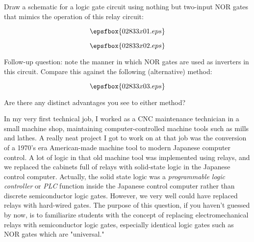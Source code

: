 

Draw a schematic for a logic gate circuit using nothing but two-input NOR gates that mimics the operation of this relay circuit:

$$\epsfbox{02833x01.eps}$$







$$\epsfbox{02833x02.eps}$$

\vskip 10pt

Follow-up question: note the manner in which NOR gates are used as inverters in this circuit.  Compare this against the following (alternative) method:

$$\epsfbox{02833x03.eps}$$

Are there any distinct advantages you see to either method?







In my very first technical job, I worked as a CNC maintenance technician in a small machine shop, maintaining computer-controlled machine tools such as mills and lathes.  A really neat project I got to work on at that job was the conversion of a 1970's era American-made machine tool to modern Japanese computer control.  A lot of logic in that old machine tool was implemented using relays, and we replaced the cabinets full of relays with solid-state logic in the Japanese control computer.  Actually, the solid state logic was a {\it programmable logic controller} or {\it PLC} function inside the Japanese control computer rather than discrete semiconductor logic gates.  However, we very well could have replaced relays with hard-wired gates.  The purpose of this question, if you haven't guessed by now, is to familiarize students with the concept of replacing electromechanical relays with semiconductor logic gates, especially identical logic gates such as NOR gates which are "universal."




